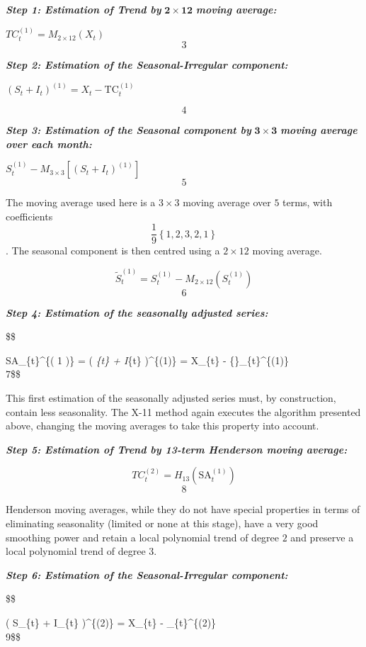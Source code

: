 \documentclass[
  letterpaper,
  DIV=11,
  numbers=noendperiod]{scrreprt}
\begin{document}
\textbf{\emph{Step 1: Estimation of Trend by}} \(\mathbf{2 \times 12}\)
\textbf{\emph{moving average:}}

\(TC_{t}^{(1)} = M_{2 \times 12}(X_{t})\) \[3\]

\textbf{\emph{Step 2: Estimation of the Seasonal-Irregular component:}}

\(\left( S_{t} + I_{t} \right)^{(1)} = X_{t} - \text{TC}_{t}^{(1)}\)

\[4\]

\textbf{\emph{Step 3: Estimation of the Seasonal component by}}
\(\mathbf{3 \times 3}\) \textbf{\emph{moving average over each month:}}

\(S_{t}^{(1)} - M_{3 \times 3}\left\lbrack \left( S_{t} + I_{t} \right)^{(1)} \right\rbrack\)
\[5\]

The moving average used here is a \(3 \times 3\) moving average over
\(5\) terms, with coefficients
\[\frac{1}{9} \left\{1, 2, 3, 2, 1 \right\}\]. The seasonal component is
then centred using a \(2 \times 12\) moving average.

\[
   \widetilde{S}_{t}^{(1)} = S_{t}^{(1)} - M_{2 \times 12}\left( S_{t}^{(1)} \right)
  \] \[6\]

\textbf{\emph{Step 4: Estimation of the seasonally adjusted series:}}

\$\$

SA\_\{t\}\^{}\{\left( 1 \right)\} = \left( \emph{\{t\} +
I}\{t\} \right)\^{}\{(1)\} = X\_\{t\} -
\{\}\_\{t\}\^{}\{(1)\} \[ \]7\$\$

This first estimation of the seasonally adjusted series must, by
construction, contain less seasonality. The X-11 method again executes
the algorithm presented above, changing the moving averages to take this
property into account.

\textbf{\emph{Step 5: Estimation of Trend by 13-term Henderson moving
average:}}

\[
  TC_{t}^{(2)} = H_{13}\left( \text{SA}_{t}^{\left( 1 \right)} \right)
  \] \[8\]

Henderson moving averages, while they do not have special properties in
terms of eliminating seasonality (limited or none at this stage), have a
very good smoothing power and retain a local polynomial trend of degree
\(2\) and preserve a local polynomial trend of degree \(3\).

\textbf{\emph{Step 6: Estimation of the Seasonal-Irregular component:}}

\$\$

\left( S\_\{t\} + I\_\{t\} \right)\^{}\{(2)\} = X\_\{t\} -
\_\{t\}\^{}\{(2)\} \[ \]9\$\$
\end{document}
